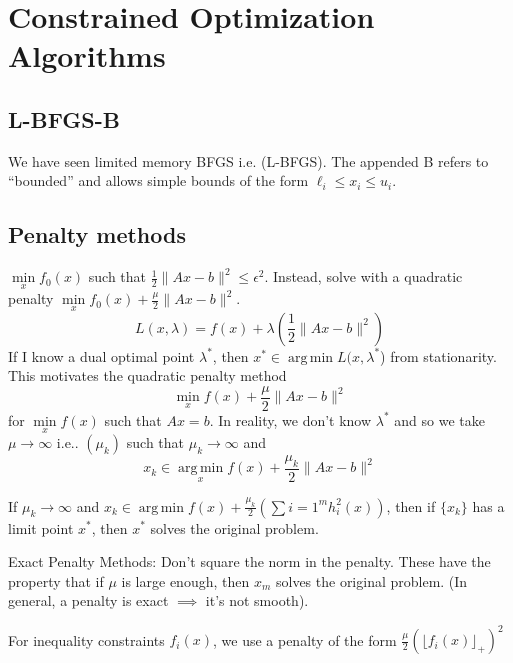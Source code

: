 \documentclass[english, 11pt]{article}
\DeclareMathOperator*{\argmin}{arg\,min}
\begin{document}
\section{Constrained Optimization Algorithms}




\subsection{L-BFGS-B} We have seen limited memory BFGS i.e. (L-BFGS). The appended B refers to ``bounded'' and allows simple bounds of the form $\ell_i \le x_i \le u_i$.




\subsection{Penalty methods} $\min \limits_x f_0(x)$ such that $\frac{1}{2} \|Ax-b\|^2 \le \epsilon^2$. Instead, solve with a quadratic penalty $\min  \limits_x f_0(x) + \frac{\mu}{2} \|Ax-b\|^2$. 
\[
L(x,\lambda) = f(x) + \lambda \left( \frac{1}{2} \|Ax-b\|^2 \right)
\]
If I know a dual optimal point $\lambda^*$, then $x^* \in \argmin L(x,\lambda^*$) from stationarity. This motivates the quadratic penalty method 
\[
\min \limits_x f(x) + \frac{\mu}{2} \|Ax-b\|^2
\]
for $\min \limits_x f(x)$ such that $Ax=b$. In reality, we don't know $\lambda^*$ and so we take $\mu \to \infty$ i.e.. $(\mu_k)$ such that $\mu_k \to \infty$ and
\[
x_k \in \argmin \limits_x f(x) + \frac{\mu_k}{2} \|Ax-b\|^2
\]

\begin{thrm}
If $\mu_k \to \infty$ and $x_k  \in \argmin f(x) + \frac{\mu_k}{2} \left( \sum{i=1}^m h_i^2(x) \right)$, then if $\{x_k\}$ has a limit point $x^*$, then $x^*$ solves the original problem.
\end{thrm}





\begin{rem}
Exact Penalty Methods: Don't square the norm in the penalty. These have the property that if $\mu $ is large enough, then $x_m$ solves the original problem. (In general, a penalty is exact $\implies$ it's not smooth).
\end{rem}

\begin{rem}
For inequality constraints $f_i(x)$, we use a penalty of the form $\frac{\mu}{2} \left( \lfloor f_i(x) \rfloor_+ \right)^2$
\end{rem}
\end{document}
